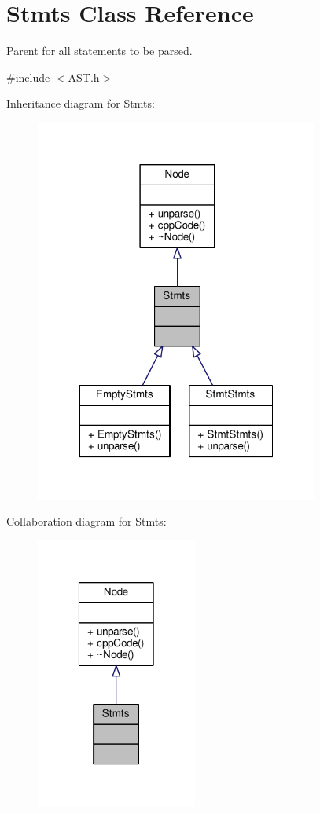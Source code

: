 \hypertarget{classStmts}{\section{Stmts Class Reference}
\label{classStmts}
}


Parent for all statements to be parsed.  




{\ttfamily \#include $<$A\-S\-T.\-h$>$}



Inheritance diagram for Stmts\-:\nopagebreak
\begin{figure}[H]
\begin{center}
\leavevmode
\includegraphics[width=263pt]{classStmts__inherit__graph}
\end{center}
\end{figure}


Collaboration diagram for Stmts\-:\nopagebreak
\begin{figure}[H]
\begin{center}
\leavevmode
\includegraphics[width=150pt]{classStmts__coll__graph}
\end{center}
\end{figure}
